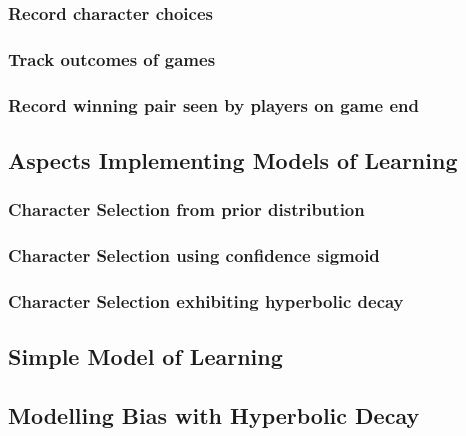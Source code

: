 \subsubsection{Record character choices}

\subsubsection{Track outcomes of games}

\subsubsection{Record winning pair seen by players on game end}


\subsection{Aspects Implementing Models of Learning}

\subsubsection{Character Selection from prior distribution}

\subsubsection{Character Selection using confidence sigmoid}

\subsubsection{Character Selection exhibiting hyperbolic decay}




\subsection{Simple Model of Learning}\label{subsec:optimisation_with_aspects_basiclearningaspect}





\subsection{Modelling Bias with Hyperbolic Decay}\label{subsec:optimisation_with_aspects_hyperbolicdecay}

